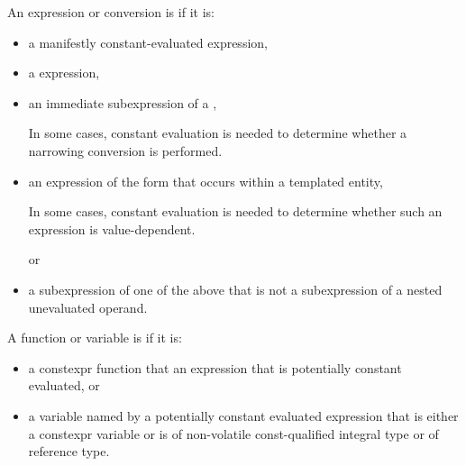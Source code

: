 \pnum
{}%
An expression or conversion is 
if it is:
\begin{itemize}
\item
a manifestly constant-evaluated expression,

\item
a  expression,

\item
an immediate subexpression of a ,
\begin{footnote}
In some cases, constant evaluation is needed to determine whether a narrowing conversion is performed.
\end{footnote}

\item
an expression of the form \tcode{\&} 
that occurs within a templated entity,
\begin{footnote}
In some cases, constant evaluation is needed to determine whether such an expression is value-dependent.
\end{footnote}
or

\item
a subexpression of one of the above
that is not a subexpression of a nested unevaluated operand.
\end{itemize}

%
%
A function or variable is
if it is:
\begin{itemize}
\item
a constexpr function that
an expression
that is potentially constant evaluated, or

\item
a variable named by a potentially constant evaluated expression
that is either a constexpr variable or
is of non-volatile const-qualified integral type or of reference type.
\end{itemize}

